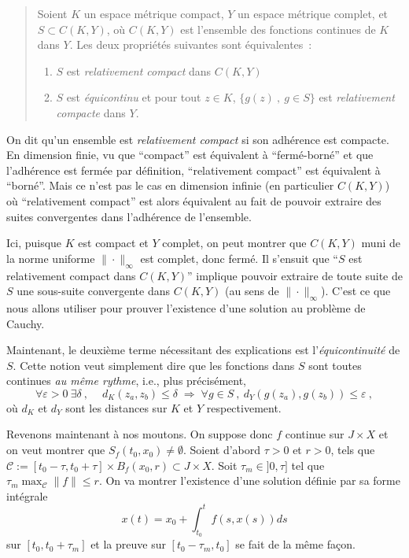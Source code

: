 \begin{quote}
Soient \(K\) un espace métrique compact, \(Y\) un espace métrique
complet, et \(S\subset C(K,Y)\), où \(C(K,Y)\) est l'ensemble des
fonctions continues de \(K\) dans \(Y\). Les deux propriétés suivantes
sont équivalentes~:

\begin{enumerate}
\def\labelenumi{\arabic{enumi}.}
\item
  \(S\) est \emph{relativement compact} dans \(C(K,Y)\)
\item
  \(S\) est \emph{équicontinu} et pour tout \(z\in K\),
  \(\{g(z) \ , \ g\in S \}\) est \emph{relativement compacte} dans
  \(Y\).
\end{enumerate}
\end{quote}

On dit qu'un ensemble est \emph{relativement compact} si son adhérence
est compacte. En dimension finie, vu que ``compact'' est équivalent à
``fermé-borné'' et que l'adhérence est fermée par définition,
``relativement compact'' est équivalent à ``borné''. Mais ce n'est pas
le cas en dimension infinie (en particulier \(C(K,Y)\)) où
``relativement compact'' est alors équivalent au fait de pouvoir
extraire des suites convergentes dans l'adhérence de l'ensemble.

Ici, puisque \(K\) est compact et \(Y\) complet, on peut montrer que
\(C(K,Y)\) muni de la norme uniforme \(\|\cdot\|_\infty\) est complet,
donc fermé. Il s'ensuit que ``\(S\) est relativement compact dans
\(C(K,Y)\)'' implique pouvoir extraire de toute suite de \(S\) une
sous-suite convergente dans \(C(K,Y)\) (au sens de
\(\|\cdot\|_\infty\)). C'est ce que nous allons utiliser pour prouver
l'existence d'une solution au problème de Cauchy.

Maintenant, le deuxième terme nécessitant des explications est
l'\emph{équicontinuité} de \(S\). Cette notion veut simplement dire que
les fonctions dans \(S\) sont toutes continues \emph{au même rythme},
i.e., plus précisément, \[
\forall \varepsilon >0 \ \exists \delta \ , \quad \ d_K(z_a,z_b)\leq \delta \; \Longrightarrow \;\forall g\in S \ , \  d_Y(g(z_a),g(z_b)) \leq \varepsilon \ ,
\] où \(d_K\) et \(d_Y\) sont les distances sur \(K\) et \(Y\)
respectivement.

Revenons maintenant à nos moutons. On suppose donc \(f\) continue sur
\(J\times X\) et on veut montrer que \(S_f(t_0,x_0)\neq \emptyset\).
Soient d'abord \(\tau >0\) et \(r>0\), tels que
\(\mathcal{C}:= [t_0-\tau,t_0+\tau]\times B_f(x_0,r) \subset J\times X\).
Soit \(\tau_m\in]0, \tau]\) tel que
\(\tau_m\max_\mathcal{C}\|f\|\leq r\). On va montrer l'existence d'une
solution définie par sa forme intégrale \[
x(t) = x_0 + \int_{t_0}^t f(s,x(s)) ds
\] sur \([t_0,t_0+\tau_m]\) et la preuve sur \([t_0-\tau_m,t_0]\) se
fait de la même façon.

